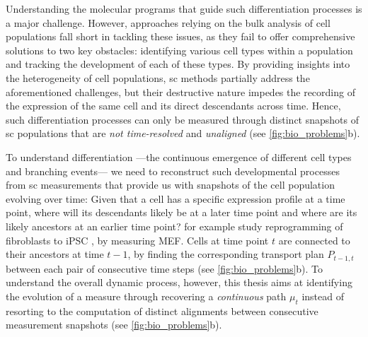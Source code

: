 Understanding the molecular programs that guide such differentiation processes is a major challenge.
However, approaches relying on the bulk analysis of cell populations fall short in tackling these issues, as they fail to offer comprehensive solutions to two key obstacles: identifying various cell types within a population and tracking the development of each of these types.
By providing insights into the heterogeneity of cell populations, \acrlong{sc} methods partially address the aforementioned challenges, but their destructive nature impedes the recording of the expression of the same cell and its direct descendants across time.
Hence, such differentiation processes can only be measured through distinct snapshots of \acrlong{sc} populations that are \textit{not time-resolved} and \textit{unaligned} (see \cref{fig:bio_problems}b).

To understand differentiation ---the continuous emergence of different cell types and branching events--- we need to reconstruct such developmental processes from \acrlong{sc} measurements that provide us with snapshots of the cell population evolving over time:
Given that a cell has a specific expression profile at a time point, where will its descendants likely be at a later time point and where are its likely ancestors at an earlier time point? 
\citet{schiebinger2019optimal} for example study reprogramming of fibroblasts to \acrfull{iPSC} \citep{takahashi2006induction}, by measuring \acrfull{MEF}. Cells at time point $t$ are connected to their ancestors at time $t-1$, by finding the corresponding transport plan $P_{t-1,t}$ between each pair of consecutive time steps (see \cref{fig:bio_problems}b).
To understand the overall dynamic process, however, this thesis aims at identifying the evolution of a measure through recovering a \emph{continuous} path $\mu_t$ instead of resorting to the computation of distinct alignments between consecutive measurement snapshots \citep{lavenant2021towards} (see \cref{fig:bio_problems}b).

